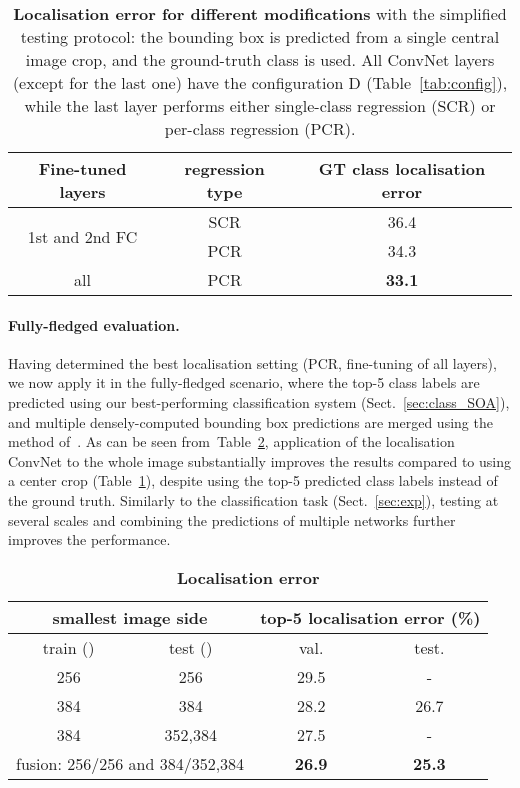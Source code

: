\documentclass{article} \usepackage{iclr2015,times}
\newcommand{\tblref}[1]{Table~\ref{#1}}
\newcommand{\sref}[1]{Sect.~\ref{#1}}
\begin{document}
\begin{table}[htb]
\setlength{\tabcolsep}{2pt}
\small
\centering
\caption{\textbf{Localisation error for different modifications} with
the simplified testing protocol: the bounding box is predicted from a single central image crop, and the ground-truth class is used.
All ConvNet layers (except for the last one) have the configuration D (\tblref{tab:config}), while
the last layer performs either single-class regression (SCR) or per-class regression (PCR). 
}
\begin{tabular}{|c|c|c|} \hline
Fine-tuned layers & regression type & GT class localisation error \\ \hline
\multirow{2}{*}{1st and 2nd FC} & SCR & 36.4 \\ \cline{2-3}
& PCR & 34.3 \\ \hline
all & PCR & \textbf{33.1} \\ \hline
\end{tabular}
\label{tab:loc_comparison}
\end{table}


\paragraph{Fully-fledged evaluation.}
Having determined the best localisation setting (PCR, fine-tuning of all layers), we now apply it in the fully-fledged scenario,
where the top-5 class labels are predicted using our best-performing classification system (\sref{sec:class_SOA}), and multiple densely-computed bounding box predictions are merged using 
the method of~\citet{Sermanet14}.
As can be seen from~\tblref{tab:loc_full}, application of the localisation ConvNet to the whole image substantially improves the results compared to using a center crop (\tblref{tab:loc_comparison}),
despite using the top-5 predicted class labels instead of the ground truth.
Similarly to the classification task (\sref{sec:exp}), testing at several scales and combining the predictions of multiple networks
further improves the performance.

\begin{table}[htb]
\small
\centering
\caption{\textbf{Localisation error}
}
\begin{tabular}{|c|c|c|c|} \hline
\multicolumn{2}{|c|}{smallest image side} & \multicolumn{2}{c|}{top-5 localisation error (\%)} \\ \hline
train () & test () & val. & test. \\ \hline
256 & 256 & 29.5 & - \\ \hline
384 & 384 & 28.2 & 26.7\\ \hline
384 & 352,384 & 27.5 & - \\ \hline\hline
\multicolumn{2}{|c|}{fusion: 256/256 and 384/352,384} & \textbf{26.9} & \textbf{25.3} \\ \hline
\end{tabular}
\label{tab:loc_full}
\end{table}
\end{document}
